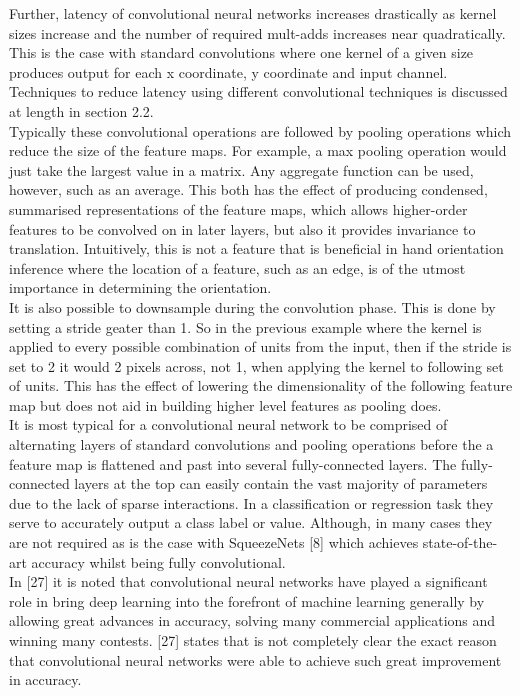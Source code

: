 \documentclass{article}
\begin{document}
Further, latency of convolutional neural networks increases drastically as kernel sizes increase and the number of required mult-adds increases near quadratically. This is the case with standard convolutions where one kernel of a given size produces output for each x coordinate, y coordinate and input channel. Techniques to reduce latency using different convolutional techniques is discussed at length in section 2.2. \\

Typically these convolutional operations are followed by pooling operations which reduce the size of the feature maps. For example, a max pooling operation would just take the largest value in a matrix. Any aggregate function can be used, however, such as an average. This both has the effect of producing condensed, summarised representations of the feature maps, which allows higher-order features to be convolved on in later layers, but also it provides invariance to translation. Intuitively, this is not a feature that is beneficial in hand orientation inference where the location of a feature, such as an edge, is of the utmost importance in determining the orientation. \\

It is also possible to downsample during the convolution phase. This is done by setting a stride geater than 1. So in the previous example where the kernel is applied to every possible combination of units from the input, then if the stride is set to 2 it would 2 pixels across, not 1, when applying the kernel to following set of units. This has the effect of lowering the dimensionality of the following feature map but does not aid in building higher level features as pooling does.\\

It is most typical for a convolutional neural network to be comprised of alternating layers of standard convolutions and pooling operations before the a feature map is flattened and past into several fully-connected layers. The fully-connected layers at the top can easily contain the vast majority of parameters due to the lack of sparse interactions. In a classification or regression task they serve to accurately output a class label or value. Although, in many cases they are not required as is the case with SqueezeNets [8] which achieves state-of-the-art accuracy whilst being fully convolutional. \\

In [27] it is noted that convolutional neural networks have played a significant role in bring deep learning into the forefront of machine learning generally by allowing great advances in accuracy, solving many commercial applications and winning many contests. [27] states that is not completely clear the exact reason that convolutional neural networks were able to achieve such great improvement in accuracy.\\ 
\end{document}

